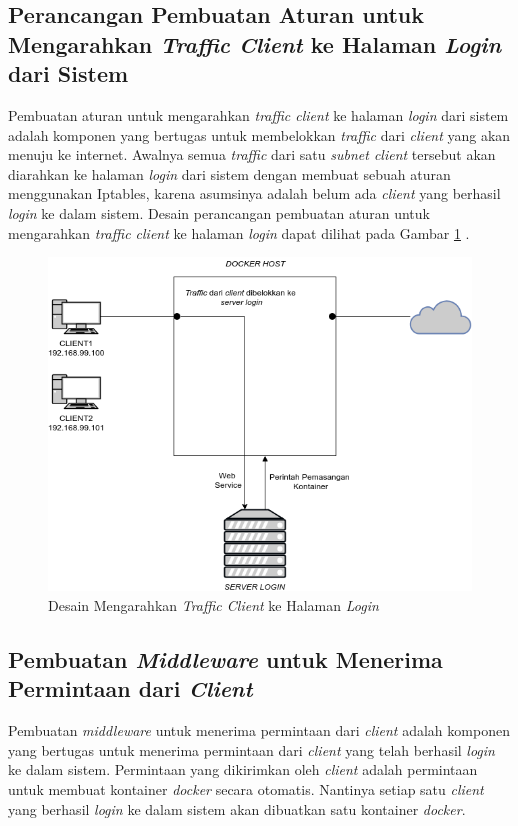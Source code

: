 \subsection{Perancangan Pembuatan Aturan untuk Mengarahkan \textit{Traffic Client} ke Halaman \textit{Login} dari Sistem}
Pembuatan aturan untuk mengarahkan \textit{traffic client} ke halaman \textit{login} dari sistem adalah komponen yang bertugas untuk membelokkan \textit{traffic} dari \textit{client} yang akan menuju ke internet. Awalnya semua \textit{traffic} dari satu \textit{subnet client} tersebut akan diarahkan ke halaman \textit{login} dari sistem dengan membuat sebuah aturan menggunakan Iptables, karena asumsinya adalah belum ada \textit{client} yang berhasil \textit{login} ke dalam sistem. Desain perancangan pembuatan aturan untuk mengarahkan \textit{traffic client} ke halaman \textit{login} dapat dilihat pada Gambar \ref{dessainmengarahkankehalamanlogin} .
\begin{figure}[H]
	\centering
	\includegraphics[width=\linewidth]{images/bab3/DIAGRAM2}
	\caption{Desain Mengarahkan \textit{Traffic Client} ke Halaman \textit{Login}}
	\label{dessainmengarahkankehalamanlogin}
\end{figure}

\subsection{Pembuatan \textit{Middleware} untuk Menerima Permintaan dari \textit{Client}}
Pembuatan \textit{middleware} untuk menerima permintaan dari \textit{client} adalah komponen yang bertugas untuk menerima permintaan dari \textit{client} yang telah berhasil \textit{login} ke dalam sistem. Permintaan yang dikirimkan oleh \textit{client} adalah permintaan untuk membuat kontainer \textit{docker} secara otomatis. Nantinya setiap satu \textit{client} yang berhasil \textit{login} ke dalam sistem akan dibuatkan satu kontainer \textit{docker}.

